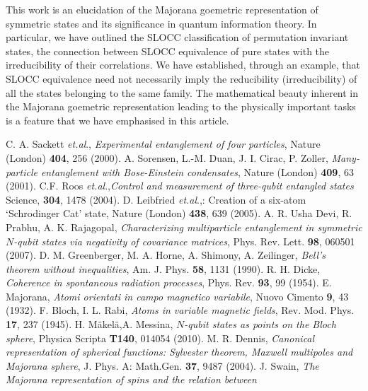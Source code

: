 {This work is an elucidation of the Majorana goemetric representation of symmetric states and its significance in quantum information theory. In particular, we have outlined the SLOCC classification of permutation invariant states, the connection between SLOCC equivalence of pure states with the irreducibility \cite{SP1,SP2,SP2b} of their correlations. We have established, through an example, that SLOCC equivalence need not necessarily imply the reducibility (irreducibility) of all the states belonging to the same family. The  mathematical beauty inherent in the Majorana goemetric representation leading to the physically important tasks is a feature that we have emphasised in this article. 


\renewcommand{\bibname}{References}
\begin{thebibliography}{99}
 C. A. Sackett {\it{et.al}}., {\em Experimental entanglement of four particles},  Nature (London) {\bf{404}}, 256 (2000).
 A. Sorensen, L.-M. Duan, J. I. Cirac, P. Zoller, {\em Many-particle entanglement with
Bose-Einstein condensates}, Nature (London) {\bf{409}}, 63 (2001).
C.F. Roos  {\it{et.al}}.,{\em Control and measurement of three-qubit entangled states} Science, {\bf{304}}, 1478 (2004).
 D. Leibfried  {\it{et.al}}.,: Creation of a six-atom `Schrodinger Cat' state, Nature (London) {\bf{438}}, 639 (2005).
 A. R. Usha Devi, R. Prabhu,  A. K. Rajagopal, {\em Characterizing multiparticle entanglement in symmetric $N$-qubit states
via negativity of covariance matrices}, Phys. Rev. Lett. {\bf{98}}, 060501 (2007).  
 D. M. Greenberger, M. A. Horne, A. Shimony, A. Zeilinger, {\em Bell's theorem without inequalities}, Am. J. Phys. {\bf 58}, 1131 (1990).
 R. H. Dicke,  {\em Coherence in spontaneous radiation processes}, Phys. Rev. {\bf 93}, 99 (1954).
 E. Majorana, {\em Atomi orientati in campo magnetico variabile}, Nuovo Cimento {\bf 9}, 43  (1932). 
 F. Bloch, I. L. Rabi, {\em  Atoms in variable magnetic fields}, Rev. Mod. Phys. {\bf 17}, 237 (1945).
  H. M{\"a}kel{\"a},A.  Messina, {\em  $N$-qubit states as points on the
Bloch sphere}, Physica Scripta {\bf T140}, 014054 (2010). 
 M. R. Dennis, {\em  Canonical representation of spherical functions:
Sylvester theorem, Maxwell multipoles and Majorana sphere}, J. Phys. A: Math.Gen. {\bf 37}, 9487 (2004).
 J. Swain, {\em The Majorana representation of spins and the relation between
}
\end{thebibliography}}

